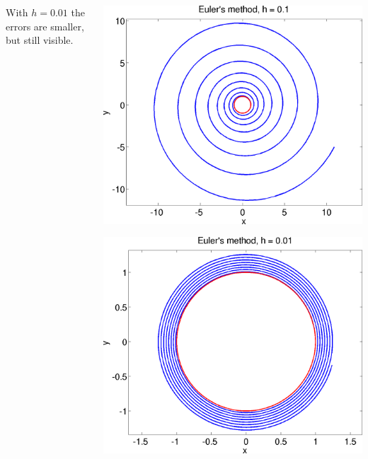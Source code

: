\documentclass{beamer}
\begin{document}
\begin{frame}
\begin{columns}
\begin{column}{0.5\textwidth}
\begin{overlayarea}{\textwidth}{0.4\textheight}
{          With $h = 0.01$ the errors are smaller, but still visible.
        }
      \end{overlayarea}
    \end{column}
    \begin{column}{0.5\textwidth}
      \begin{overlayarea}{\textwidth}{0.6\textheight}
        {
          \begin{center}
            \includegraphics[height=0.5\textheight]{figures/EulerPlot1_crop}
          \end{center}
        }
        {
          \begin{center}
            \includegraphics[height=0.5\textheight]{figures/EulerPlot2_crop}
          \end{center}
        }
      \end{overlayarea}
    \end{column}
  \end{columns}

\end{frame}
\end{document}
